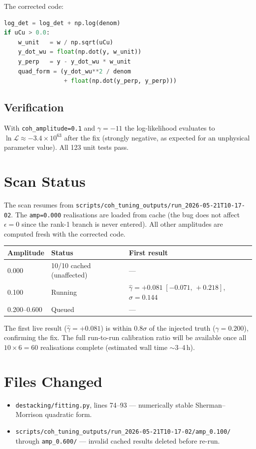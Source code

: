 \documentclass[11pt, a4paper]{article}
\begin{document}
The corrected code:

\begin{lstlisting}[language=Python]
log_det = log_det + np.log(denom)
if uCu > 0.0:
    w_unit   = w / np.sqrt(uCu)
    y_dot_wu = float(np.dot(y, w_unit))
    y_perp   = y - y_dot_wu * w_unit
    quad_form = (y_dot_wu**2 / denom
                 + float(np.dot(y_perp, y_perp)))
\end{lstlisting}

\subsection*{Verification}

With \texttt{coh\_amplitude=0.1} and $\gamma=-11$ the log-likelihood
evaluates to $\ln\mathcal{L}\approx-3.4\times10^{63}$ after the fix
(strongly negative, as expected for an unphysical parameter value).
All 123 unit tests pass.

\section{Scan Status}

The scan resumes from
\texttt{scripts/coh\_tuning\_outputs/run\_2026-05-21T10-17-02}.
The \texttt{amp=0.000} realisations are loaded from cache (the bug does not
affect $\epsilon=0$ since the rank-1 branch is never entered).
All other amplitudes are computed fresh with the corrected code.

\begin{center}
\begin{tabular}{lll}
\toprule
Amplitude & Status & First result \\
\midrule
0.000 & 10/10 cached (unaffected) & --- \\
0.100 & Running & $\hat\gamma=+0.081\;[-0.071,\,+0.218]$,\;$\sigma=0.144$ \\
0.200--0.600 & Queued & --- \\
\bottomrule
\end{tabular}
\end{center}

The first live result ($\hat\gamma=+0.081$) is within $0.8\sigma$ of the
injected truth ($\gamma=0.200$), confirming the fix.
The full run-to-run calibration ratio will be available once all
$10\times6=60$ realisations complete (estimated wall time $\sim$3--4\,h).

\section*{Files Changed}

\begin{itemize}
    \item \texttt{destacking/fitting.py}, lines 74--93 —
          numerically stable Sherman--Morrison quadratic form.
    \item \texttt{scripts/coh\_tuning\_outputs/run\_2026-05-21T10-17-02/amp\_0.100/}
          through \texttt{amp\_0.600/} — invalid cached results deleted before re-run.
\end{itemize}
\end{document}
